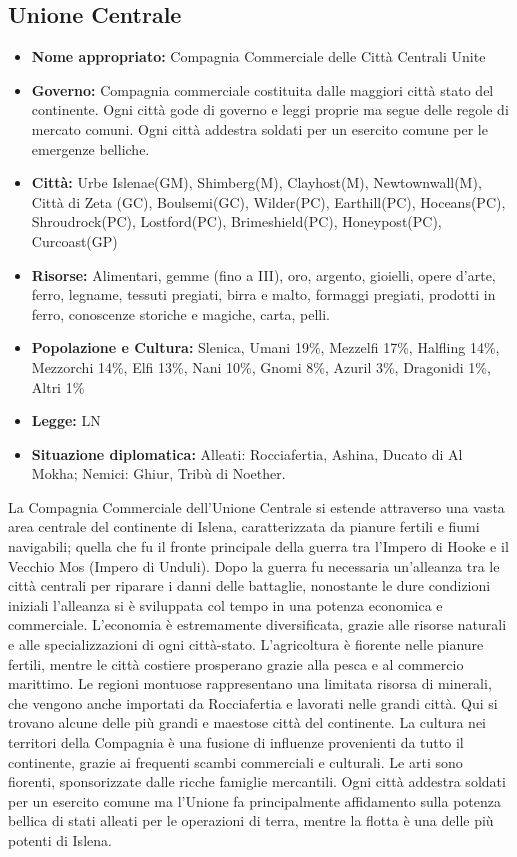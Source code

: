 \documentclass[a4paper]{report}
\begin{document}
\begin{multicols}{2}
\subsection*{Unione Centrale}
\begin{itemize}
	\item \textbf{Nome appropriato:} Compagnia Commerciale delle Città Centrali Unite
	\item \textbf{Governo: }Compagnia commerciale costituita dalle maggiori città stato del continente. Ogni città gode di governo e leggi proprie ma segue delle regole di mercato comuni. Ogni città addestra soldati per un esercito comune per le emergenze belliche.
	\item \textbf{Città:} Urbe Islenae(GM), Shimberg(M), Clayhost(M), Newtownwall(M), Città di Zeta (GC), Boulsemi(GC), Wilder(PC), Earthill(PC), Hoceans(PC), Shroudrock(PC), Lostford(PC), Brimeshield(PC), Honeypost(PC), Curcoast(GP)
	\item \textbf{Risorse:} Alimentari, gemme (fino a III), oro, argento, gioielli, opere d'arte, ferro, legname, tessuti pregiati, birra e malto, formaggi pregiati, prodotti in ferro, conoscenze storiche e magiche, carta, pelli.
	\item \textbf{Popolazione e Cultura:} Slenica, Umani 19\%, Mezzelfi 17\%, Halfling 14\%, Mezzorchi 14\%, Elfi 13\%, Nani 10\%, Gnomi 8\%, Azuril 3\%, Dragonidi 1\%, Altri 1\%
	\item \textbf{Legge:} LN
	\item \textbf{Situazione diplomatica:} Alleati: Rocciafertia, Ashina, Ducato di Al Mokha; Nemici: Ghiur, Tribù di Noether.
\end{itemize}
La Compagnia Commerciale dell'Unione Centrale si estende attraverso una vasta area centrale del continente di Islena, caratterizzata da pianure fertili e fiumi navigabili; quella che fu il fronte principale della guerra tra l'Impero di Hooke e il Vecchio Mos (Impero di Unduli). Dopo la guerra fu necessaria un'alleanza tra le città centrali per riparare i danni delle battaglie, nonostante le dure condizioni iniziali l'alleanza si è sviluppata col tempo in una potenza economica e commerciale.
L'economia è estremamente diversificata, grazie alle risorse naturali e alle specializzazioni di ogni città-stato. L'agricoltura è fiorente nelle pianure fertili, mentre le città costiere prosperano grazie alla pesca e al commercio marittimo. Le regioni montuose rappresentano una limitata risorsa di minerali, che vengono anche importati da Rocciafertia e lavorati nelle grandi città. Qui si trovano alcune delle più grandi e maestose città del continente. La cultura nei territori della Compagnia è una fusione di influenze provenienti da tutto il continente, grazie ai frequenti scambi commerciali e culturali. Le arti sono fiorenti, sponsorizzate dalle ricche famiglie mercantili. Ogni città addestra soldati per un esercito comune ma l'Unione fa principalmente affidamento sulla potenza bellica di stati alleati per le operazioni di terra, mentre la flotta è una delle più potenti di Islena.


\end{multicols}
\end{document}

